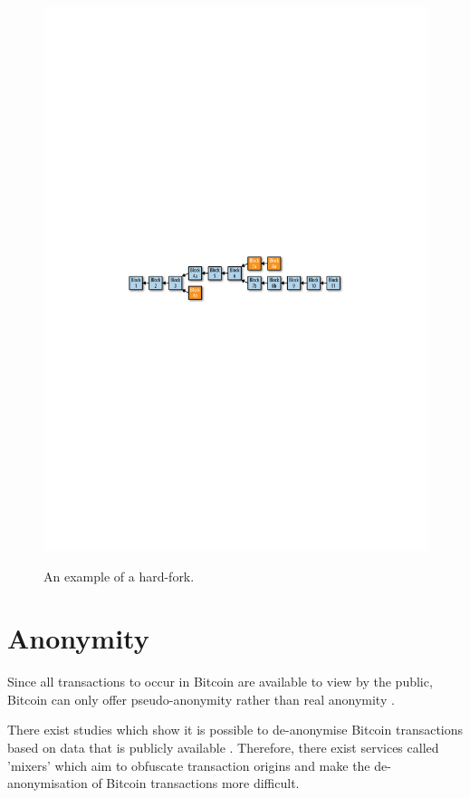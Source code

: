 \begin{figure}[h!]
  \centering
  \includegraphics[width = 15cm]{./figures/hard-fork.pdf}\\[0.5cm] 
  \caption{An example of a hard-fork. \cite{RefWorks:doc:5c39e80ae4b0854ae611b047}}
  \label{fig:hard-fork}
\end{figure}


\section{Anonymity}\label{background-anonymity}

Since all transactions to occur in Bitcoin are available to view by the public, Bitcoin can only offer pseudo-anonymity rather than real anonymity \cite{RefWorks:doc:5c3db7d6e4b0fa2b1fe68b48}.

There exist studies which show it is possible to de-anonymise Bitcoin transactions based on data that is publicly available \cite{RefWorks:doc:5c3db7d6e4b0fa2b1fe68b48}. Therefore, there exist services called 'mixers' which aim to obfuscate transaction origins and make the de-anonymisation of Bitcoin transactions more difficult. 

